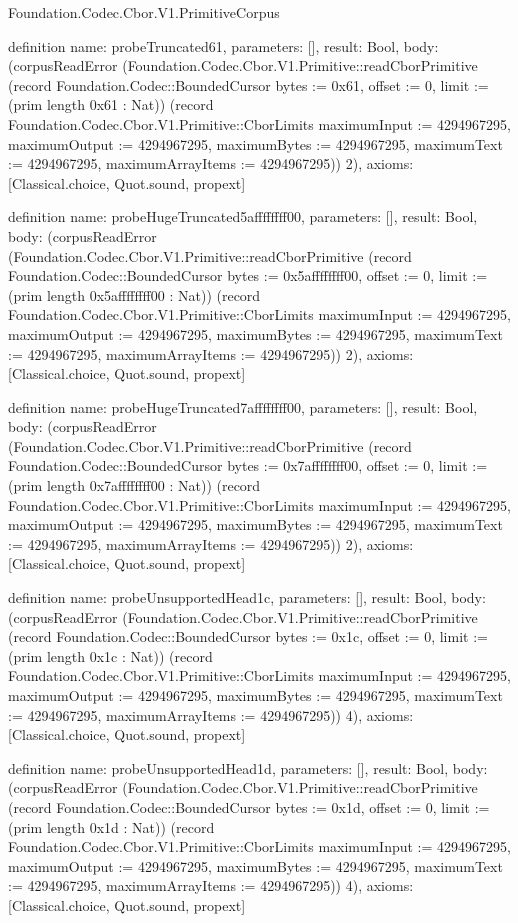 \begin{lexlean}{Foundation.Codec.Cbor.V1.PrimitiveCorpus}
\begin{semanticmodule}
definition{
  name: probeTruncated61,
  parameters: [],
  result: Bool,
  body: (corpusReadError (Foundation.Codec.Cbor.V1.Primitive::readCborPrimitive (record Foundation.Codec::BoundedCursor {bytes := 0x61, offset := 0, limit := (prim length 0x61 : Nat)}) (record Foundation.Codec.Cbor.V1.Primitive::CborLimits {maximumInput := 4294967295, maximumOutput := 4294967295, maximumBytes := 4294967295, maximumText := 4294967295, maximumArrayItems := 4294967295})) 2),
  axioms: [Classical.choice, Quot.sound, propext]
}

definition{
  name: probeHugeTruncated5affffffff00,
  parameters: [],
  result: Bool,
  body: (corpusReadError (Foundation.Codec.Cbor.V1.Primitive::readCborPrimitive (record Foundation.Codec::BoundedCursor {bytes := 0x5affffffff00, offset := 0, limit := (prim length 0x5affffffff00 : Nat)}) (record Foundation.Codec.Cbor.V1.Primitive::CborLimits {maximumInput := 4294967295, maximumOutput := 4294967295, maximumBytes := 4294967295, maximumText := 4294967295, maximumArrayItems := 4294967295})) 2),
  axioms: [Classical.choice, Quot.sound, propext]
}

definition{
  name: probeHugeTruncated7affffffff00,
  parameters: [],
  result: Bool,
  body: (corpusReadError (Foundation.Codec.Cbor.V1.Primitive::readCborPrimitive (record Foundation.Codec::BoundedCursor {bytes := 0x7affffffff00, offset := 0, limit := (prim length 0x7affffffff00 : Nat)}) (record Foundation.Codec.Cbor.V1.Primitive::CborLimits {maximumInput := 4294967295, maximumOutput := 4294967295, maximumBytes := 4294967295, maximumText := 4294967295, maximumArrayItems := 4294967295})) 2),
  axioms: [Classical.choice, Quot.sound, propext]
}

definition{
  name: probeUnsupportedHead1c,
  parameters: [],
  result: Bool,
  body: (corpusReadError (Foundation.Codec.Cbor.V1.Primitive::readCborPrimitive (record Foundation.Codec::BoundedCursor {bytes := 0x1c, offset := 0, limit := (prim length 0x1c : Nat)}) (record Foundation.Codec.Cbor.V1.Primitive::CborLimits {maximumInput := 4294967295, maximumOutput := 4294967295, maximumBytes := 4294967295, maximumText := 4294967295, maximumArrayItems := 4294967295})) 4),
  axioms: [Classical.choice, Quot.sound, propext]
}

definition{
  name: probeUnsupportedHead1d,
  parameters: [],
  result: Bool,
  body: (corpusReadError (Foundation.Codec.Cbor.V1.Primitive::readCborPrimitive (record Foundation.Codec::BoundedCursor {bytes := 0x1d, offset := 0, limit := (prim length 0x1d : Nat)}) (record Foundation.Codec.Cbor.V1.Primitive::CborLimits {maximumInput := 4294967295, maximumOutput := 4294967295, maximumBytes := 4294967295, maximumText := 4294967295, maximumArrayItems := 4294967295})) 4),
  axioms: [Classical.choice, Quot.sound, propext]
}


\end{semanticmodule}
\end{lexlean}
